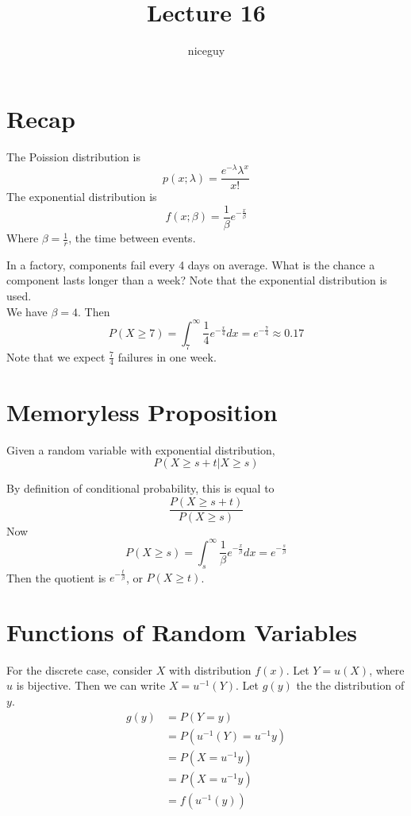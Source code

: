 \documentclass[12pt]{article}
\author{niceguy}
\title{Lecture 16}
\begin{document}
\maketitle

\section{Recap}

The Poission distribution is
$$p(x;\lambda) = \frac{e^{-\lambda}\lambda^x}{x!}$$
The exponential distribution is
$$f(x;\beta) = \frac{1}{\beta}e^{-\frac{x}{\beta}}$$
Where $\beta = \frac{1}{r}$, the time between events.

\begin{ex}
	In a factory, components fail every 4 days on average. What is the chance a component lasts longer than a week? Note that the exponential distribution is used. \\
	We have $\beta = 4$. Then
	$$P(X\geq7) = \int_7^\infty \frac{1}{4}e^{-\frac{x}{4}}dx = e^{-\frac{7}{4}} \approx 0.17$$
	Note that we expect $\frac{7}{4}$ failures in one week.
\end{ex}

\section{Memoryless Proposition}

Given a random variable with exponential distribution,
$$P(X\geq s+t|X\geq s)$$

By definition of conditional probability, this is equal to
$$\frac{P(X\geq s+t)}{P(X\geq s)}$$
Now
$$P(X\geq s) = \int_s^\infty \frac{1}{\beta}e^{-\frac{x}{\beta}}dx = e^{-\frac{s}{\beta}}$$
Then the quotient is $e^{-\frac{t}{\beta}}$, or $P(X\geq t)$.

\section{Functions of Random Variables}

For the discrete case, consider $X$ with distribution $f(x)$. Let $Y=u(X)$, where $u$ is bijective. Then we can write $X = u^{-1}(Y)$. Let $g(y)$ the the distribution of $y$.
\begin{align*}
	g(y) &= P(Y=y) \\
	     &= P(u^{-1}(Y)=u^{-1}y) \\
	     &= P(X=u^{-1}y) \\
	     &= P(X=u^{-1}y) \\
	     &= f(u^{-1}(y))
\end{align*}
\end{document}
